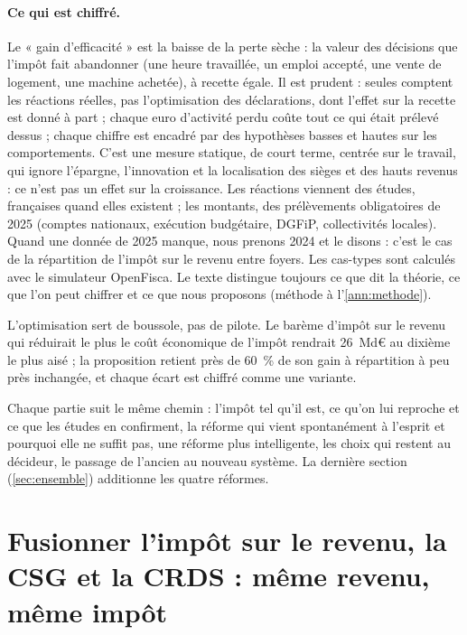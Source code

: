 \documentclass[11pt,a4paper]{article}
\begin{document}
\paragraph{Ce qui est chiffré.} Le « gain d'efficacité » est la baisse de la perte sèche : la valeur des décisions que
l'impôt fait abandonner (une heure travaillée, un emploi accepté, une vente de logement, une machine achetée), à recette
égale. Il est prudent : seules comptent les réactions réelles, pas l'optimisation des déclarations, dont l'effet sur la
recette est donné à part ; chaque euro d'activité perdu coûte tout ce qui était prélevé dessus ; chaque chiffre est
encadré par des hypothèses basses et hautes sur les comportements. C'est une mesure statique, de court terme, centrée
sur le travail, qui ignore l'épargne, l'innovation et la localisation des sièges et des hauts revenus : ce n'est pas un
effet sur la croissance. Les réactions viennent des études, françaises quand elles existent ; les montants, des
prélèvements obligatoires de 2025 (comptes nationaux, exécution budgétaire, DGFiP, collectivités locales). Quand une
donnée de 2025 manque, nous prenons 2024 et le disons : c'est le cas de la répartition de l'impôt sur le revenu entre
foyers. Les cas-types sont calculés avec le simulateur OpenFisca. Le texte distingue toujours ce que dit la théorie, ce
que l'on peut chiffrer et ce que nous proposons (méthode à l'\ref{ann:methode}).

L'optimisation sert de boussole, pas de pilote. Le barème d'impôt sur le revenu qui réduirait le plus le coût
économique de l'impôt rendrait 26~Md€ au dixième le plus aisé ; la proposition retient près de 60~\% de son gain à
répartition à peu près inchangée, et chaque écart est chiffré comme une variante.

Chaque partie suit le même chemin : l'impôt tel qu'il est, ce qu'on lui reproche et ce que les études en confirment, la
réforme qui vient spontanément à l'esprit et pourquoi elle ne suffit pas, une réforme plus intelligente, les choix qui
restent au décideur, le passage de l'ancien au nouveau système. La dernière section (\ref{sec:ensemble}) additionne les
quatre réformes.


\section{Fusionner l'impôt sur le revenu, la CSG et la CRDS : même revenu, même impôt}\label{sec:ircsg}
\end{document}

